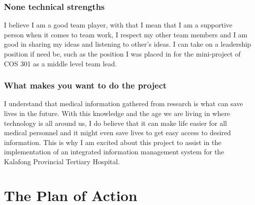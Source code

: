 \documentclass[hidelinks, 12pt, oneside]{article}
\begin{document}
\subsubsection{None technical strengths}
I believe I am a good team player, with that I mean that I am a supportive
person when it comes to team work, I respect my other team members and
I am good in sharing my ideas and listening to other's ideas. I can take on
a leadership position if need be, such as the position I was placed in for the
mini-project of COS 301 as a middle level team lead.

\subsubsection{What makes you want to do the project}
I understand that medical information gathered from research is what can save lives in the future. With this knowledge and the age we are living in where technology is all around us, I do believe that it can make life easier for all medical personnel and it might even   save lives to get easy access to desired information. This is why I am excited about this project to assist in  the implementation of an integrated information management system  for the Kalafong Provincial Tertiary Hospital.

\section{The Plan of Action}
\end{document}
